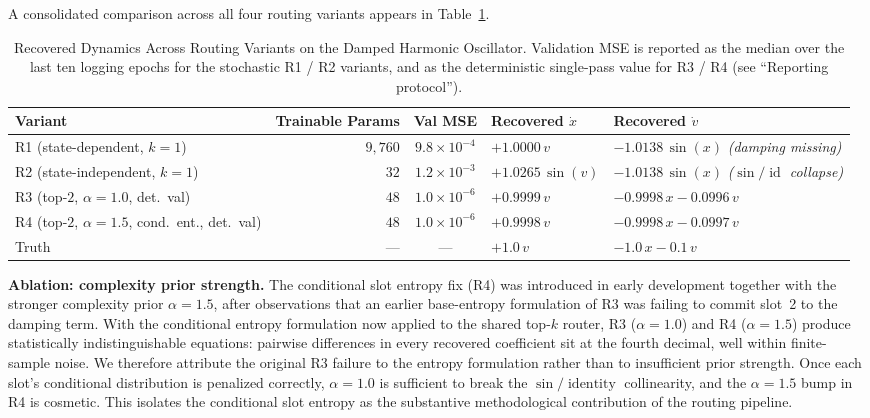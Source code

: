 \documentclass[conference]{IEEEtran}
\begin{document}
A consolidated comparison across all four routing variants appears in Table~\ref{tab:variants}.

\begin{table}[htbp]
  \caption{Recovered Dynamics Across Routing Variants on the Damped Harmonic Oscillator. Validation MSE is reported as the median over the last ten logging epochs for the stochastic R1 / R2 variants, and as the deterministic single-pass value for R3 / R4 (see ``Reporting protocol'').}
  \label{tab:variants}
  \centering
  \begin{tabular}{lrcll}
    \toprule
    Variant                                              & Trainable Params & Val MSE              & Recovered $\dot{x}$ & Recovered $\dot{v}$                                                  \\
    \midrule
    R1 (state-dependent, $k{=}1$)                        & $9{,}760$        & $9.8{\times}10^{-4}$ & $+1.0000\,v$        & $-1.0138\,\sin(x)$ \quad\textit{(damping missing)}                   \\
    R2 (state-independent, $k{=}1$)                      & $32$             & $1.2{\times}10^{-3}$ & $+1.0265\,\sin(v)$  & $-1.0138\,\sin(x)$ \quad\textit{($\sin/\operatorname{id}$ collapse)} \\
    R3 (top-$2$, $\alpha{=}1.0$, det.\ val)              & $48$             & $1.0{\times}10^{-6}$ & $+0.9999\,v$        & $-0.9998\,x - 0.0996\,v$                                             \\
    R4 (top-$2$, $\alpha{=}1.5$, cond.\ ent., det.\ val) & $48$             & $1.0{\times}10^{-6}$ & $+0.9998\,v$        & $-0.9998\,x - 0.0997\,v$                                             \\
    \midrule
    Truth                                                & ---              & ---                  & $+1.0\,v$           & $-1.0\,x - 0.1\,v$                                                   \\
    \bottomrule
  \end{tabular}
\end{table}

\textbf{Ablation: complexity prior strength.} The conditional slot entropy fix (R4) was introduced in early development together with the stronger complexity prior $\alpha=1.5$, after observations that an earlier base-entropy formulation of R3 was failing to commit slot~2 to the damping term. With the conditional entropy formulation now applied to the shared top-$k$ router, R3 ($\alpha=1.0$) and R4 ($\alpha=1.5$) produce statistically indistinguishable equations: pairwise differences in every recovered coefficient sit at the fourth decimal, well within finite-sample noise. We therefore attribute the original R3 failure to the entropy formulation rather than to insufficient prior strength. Once each slot's conditional distribution is penalized correctly, $\alpha=1.0$ is sufficient to break the $\sin / \operatorname{identity}$ collinearity, and the $\alpha=1.5$ bump in R4 is cosmetic. This isolates the conditional slot entropy as the substantive methodological contribution of the routing pipeline.
\end{document}
